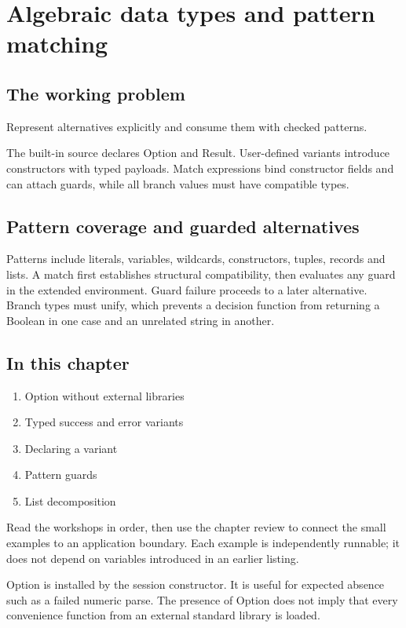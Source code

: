\chapter{Algebraic data types and pattern matching}\label{ch:17}
\section*{The working problem}
Represent alternatives explicitly and consume them with checked patterns.

The built-in source declares Option and Result. User-defined variants introduce constructors with typed payloads. Match expressions bind constructor fields and can attach guards, while all branch values must have compatible types.

\section*{Pattern coverage and guarded alternatives}
Patterns include literals, variables, wildcards, constructors, tuples, records and lists. A match first establishes structural compatibility, then evaluates any guard in the extended environment. Guard failure proceeds to a later alternative. Branch types must unify, which prevents a decision function from returning a Boolean in one case and an unrelated string in another.

\section*{In this chapter}
\begin{enumerate}
\item Option without external libraries
\item Typed success and error variants
\item Declaring a variant
\item Pattern guards
\item List decomposition
\end{enumerate}
Read the workshops in order, then use the chapter review to connect the small examples to an application boundary. Each example is independently runnable; it does not depend on variables introduced in an earlier listing.

\clearpage
{}
Option is installed by the session constructor. It is useful for expected absence such as a failed numeric parse. The presence of Option does not imply that every convenience function from an external standard library is loaded.

